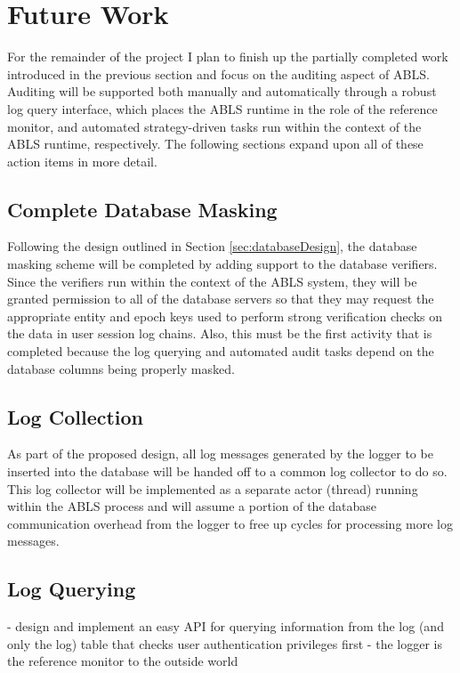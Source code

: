 \documentclass{sig-alternate}
\begin{document}
\section{Future Work}
For the remainder of the project I plan to finish up the partially completed work introduced in the previous section and 
focus on the auditing aspect of ABLS. Auditing will be supported both manually and automatically through
a robust log query interface, which places the ABLS runtime in the role of the reference monitor, and automated
strategy-driven tasks run within the context of the ABLS runtime, respectively. The following sections expand upon all
of these action items in more detail.

\subsection{Complete Database Masking}
Following the design outlined in Section \ref{sec:databaseDesign}, the database masking scheme will be completed by
adding support to the database verifiers. Since the verifiers run within the context of the ABLS system, they will be granted
permission to all of the database servers so that they may request the appropriate entity and epoch keys used to perform
strong verification checks on the data in user session log chains. Also, this must be the first activity that is completed 
because the log querying and automated audit tasks depend on the database columns being properly masked. 

\subsection{Log Collection}
As part of the proposed design, all log messages generated by the logger to be inserted into the 
database will be handed off to a common log collector to do so. This log collector will be implemented as a 
separate actor (thread) running within the ABLS process and will assume a portion of the database 
communication overhead from the logger to free up cycles for processing more log messages. 

\subsection{Log Querying}
- design and implement an easy API for querying information from the log (and only the log) table that checks user authentication privileges first - the logger is the reference monitor to the outside world
\end{document}
